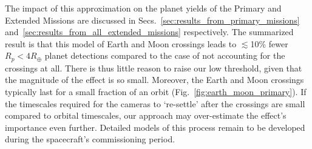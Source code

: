 The impact of this approximation on the planet yields of the Primary and 
Extended Missions are discussed in 
Secs.~\ref{sec:results_from_primary_missions} and~\ref{sec:results_from_all_extended_missions}
 respectively.
The summarized result is that this model of Earth and Moon crossings leads to $\lesssim$10\% fewer $R_p<4R_\oplus$ planet detections compared to the case of not accounting for the crossings at all.
There is thus little reason to raise our low threshold, given that the magnitude of the effect is so small.
Moreover, the Earth and Moon crossings typically last for a small fraction of an orbit (Fig.~\ref{fig:earth_moon_primary}). If the timescales required for the cameras to `re-settle' after the crossings are small compared to orbital timescales, our approach may over-estimate the effect's importance even further.
Detailed models of this process remain to be developed during the spacecraft's 
commissioning period.











